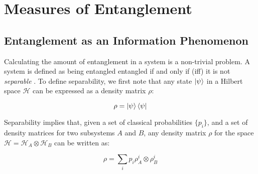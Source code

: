 \section{Measures of Entanglement}\label{sec:entanglement}
\subsection{Entanglement as an Information Phenomenon}\label{subsec:entanglement_physics}
Calculating the amount of entanglement in a system is a non-trivial problem. A system is defined as being entangled entangled if and only if (iff) it is not \textit{separable} \cite{paola_phd}. To define separability, we first note that any state $\ket{\psi}$ in a Hilbert space $\mathcal{H}$ can be expressed as a density matrix $\rho$:
 
 \begin{equation}
	\rho = \ket{\psi} \bra{\psi}
\end{equation}

 Separability implies that, given a set of classical probabilities $\{ p_i\}$, and a set of density matrices for two subsystems $A$ and $B$, any density matrix $\rho$ for the space $\mathcal{H} = \mathcal{H}_A \otimes \mathcal{H}_B$ can be written as:

\begin{equation}\label{eq:seperable_state}
	\rho = \sum_i p_i \rho_A^{i} \otimes \rho_B^{i}
\end{equation}



